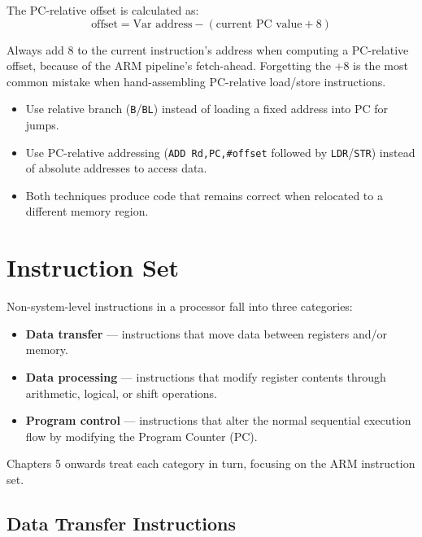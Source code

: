 \documentclass[11pt, a4paper, notitlepage]{report}
\theoremstyle{definition}
\theoremstyle{remark}
\theoremstyle{definition}
\begin{document}
The PC-relative offset is calculated as:
\[
  \text{offset} = \text{Var address} - (\text{current PC value} + 8)
\]

\begin{examtip}[title={PC-Relative Offset Calculation}]
Always add 8 to the current instruction's address when computing a PC-relative offset, because of the ARM pipeline's fetch-ahead. Forgetting the +8 is the most common mistake when hand-assembling PC-relative load/store instructions.
\end{examtip}

\begin{keyresult}[title={Position-Independent Code Summary}]
\begin{itemize}
  \item Use relative branch (\texttt{B}/\texttt{BL}) instead of loading a fixed address into PC for jumps.
  \item Use PC-relative addressing (\texttt{ADD Rd,PC,\#offset} followed by \texttt{LDR}/\texttt{STR}) instead of absolute addresses to access data.
  \item Both techniques produce code that remains correct when relocated to a different memory region.
\end{itemize}
\end{keyresult}

\chapter{Instruction Set}

Non-system-level instructions in a processor fall into three categories:

\begin{itemize}
  \item \textbf{Data transfer} --- instructions that move data between registers and/or memory.
  \item \textbf{Data processing} --- instructions that modify register contents through arithmetic, logical, or shift operations.
  \item \textbf{Program control} --- instructions that alter the normal sequential execution flow by modifying the Program Counter (PC).
\end{itemize}

Chapters 5 onwards treat each category in turn, focusing on the ARM instruction set.

\section{Data Transfer Instructions}
\end{document}
